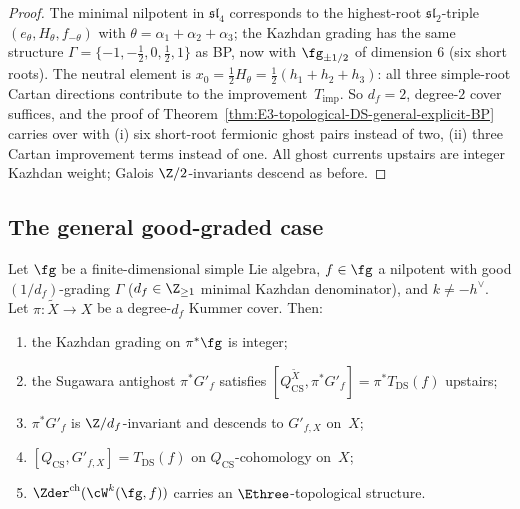 \begin{proof}
The minimal nilpotent in $\mathfrak{sl}_{4}$ corresponds to the
highest-root $\mathfrak{sl}_{2}$-triple $(e_{\theta}, H_{\theta},
f_{-\theta})$ with $\theta = \alpha_{1} + \alpha_{2} + \alpha_{3}$;
the Kazhdan grading has the same structure
$\Gamma = \{-1, -\tfrac{1}{2}, 0, \tfrac{1}{2}, 1\}$ as BP, now
with $\fg_{\pm 1/2}$ of dimension $6$ (six short roots). The
neutral element is $x_{0} = \tfrac{1}{2}H_{\theta} =
\tfrac{1}{2}(h_{1} + h_{2} + h_{3})$: all three simple-root Cartan
directions contribute to the improvement~$T_{\mathrm{imp}}$. So
$d_{f} = 2$, degree-$2$ cover suffices, and the proof of
Theorem~\ref{thm:E3-topological-DS-general-explicit-BP} carries
over with (i) six short-root fermionic ghost pairs instead of two,
(ii) three Cartan improvement terms instead of one. All ghost
currents upstairs are integer Kazhdan weight; Galois
$\Z/2$-invariants descend as before.
\end{proof}

\subsection{The general good-graded case}
\label{subsec:fm81-all-good-graded}

\begin{theorem}
\label{thm:E3-topological-DS-general-all-good-graded}
Let $\fg$ be a finite-dimensional simple Lie algebra,
$f \in \fg$ a nilpotent with good $(1/d_{f})$-grading
$\Gamma$ \textup{(}$d_{f} \in \Z_{\ge 1}$ minimal Kazhdan
denominator\textup{)}, and $k \ne -h^{\vee}$. Let
$\pi\colon \widetilde X \to X$ be a degree-$d_{f}$ Kummer cover.
Then:
\begin{enumerate}[label=\textup{(\arabic*)},nosep]
\item the Kazhdan grading on $\pi^{*}\fg$ is integer;
\item the Sugawara antighost $\pi^{*}G'_{f}$ satisfies
      $[Q_{\mathrm{CS}}^{\widetilde X}, \pi^{*}G'_{f}]
       = \pi^{*}T_{\mathrm{DS}}(f)$ upstairs;
\item $\pi^{*}G'_{f}$ is $\Z/d_{f}$-invariant and descends to
      $G'_{f, X}$ on~$X$;
\item $[Q_{\mathrm{CS}}, G'_{f, X}] = T_{\mathrm{DS}}(f)$ on
      $Q_{\mathrm{CS}}$-cohomology on~$X$;
\item $\Zder^{\mathrm{ch}}(\cW^{k}(\fg, f))$ carries an
      $\Ethree$-topological structure.
\end{enumerate}
\end{theorem}

